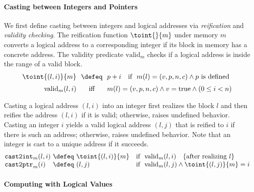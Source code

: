 \paragraph{Casting between Integers and Pointers}
We first define casting between integers and logical addresses via \emph{reification} and \emph{validity checking}.
The reification function $\toint{}{m}$ under memory $m$
converts a logical address to a corresponding integer if its block in memory has a concrete address.
The validity predicate $\text{valid}_m$ checks if a logical address
is inside the range of a valid block.
\[
\begin{array}{@{}r@{~~}c@{~~}ll@{}}
\toint{(l, i)}{m} &\defeq& p + i &\text{if }~ m(l) = (v, p, n, c) \land p\text{ is defined} \\[2mm]
\text{valid}_m(l,i) &\text{iff}& 
\multicolumn{2}{@{}l@{}}{
m(l) = (v, p, n, c) \land v=\mathrm{true} \land (0\le i < n)}
\\
\end{array}
\]

Casting a logical address $(l,i)$ into an integer first realizes the
block $l$ and then reifies the address $(l,i)$ if it is valid;
otherwise, raises undefined behavior.  Casting an integer $i$ yields a
valid logical address $(l,j)$ that is reified to $i$ if there is such
an address; otherwise, raises undefined behavior. Note that 
an integer is cast to a unique address if it succeeds.
\[
\begin{array}{@{}l@{~}c@{~}ll@{}}
\texttt{cast2int}_m(l,i) &\defeq& \toint{(l,i)}{m} &\text{if }~ \text{valid}_m(l,i)
~~~\text{\{after realizing $l$\}}
\\
\texttt{cast2ptr}_m(i)   &\defeq& (l,j) & \text{if }~ \text{valid}_m(l,j) \land \toint{(l,j)}{m}=i \\
\end{array}
\]

\paragraph{Computing with Logical Values}


